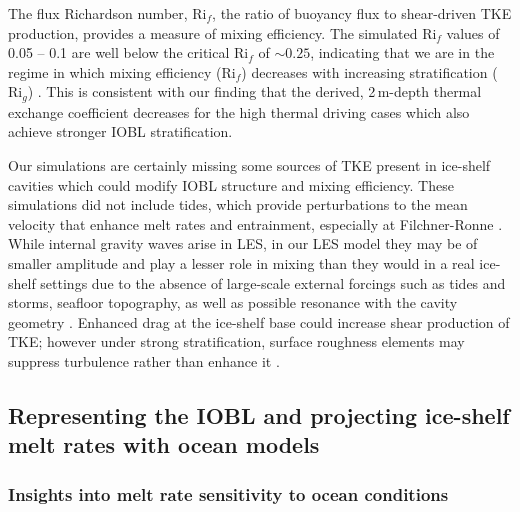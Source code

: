 \documentclass[tc, manuscript]{copernicus}
\begin{document}
The flux Richardson number, $\text{Ri}_f$, the ratio of buoyancy flux to shear-driven TKE production, provides a measure of mixing efficiency. The simulated $\text{Ri}_f$ values of 0.05 -- 0.1 are well below the critical $\text{Ri}_f$ of $\sim\!0.25$, indicating that we are in the regime in which mixing efficiency ($\text{Ri}_f$) decreases with increasing stratification ($\text{Ri}_g$) \citep{miles_stability_1961, howard_note_1961, armenio_investigation_2002, peltier_mixing_2003}. This is consistent with our finding that the derived, 2\,\unit{m}-depth thermal exchange coefficient decreases for the high thermal driving cases which also achieve stronger IOBL stratification.

Our simulations are certainly missing some sources of TKE present in ice-shelf cavities which could modify IOBL structure and mixing efficiency. These simulations did not include tides, which provide perturbations to the mean velocity that enhance melt rates and entrainment, especially at Filchner-Ronne \citep{makinson_modeling_1999, makinson_influence_2011, mueller_tidal_2018}. While internal gravity waves arise in LES, in our LES model they may be of smaller amplitude and play a lesser role in mixing than they would in a real ice-shelf settings due to the absence of large-scale external forcings such as tides and storms, seafloor topography, as well as possible resonance with the cavity geometry \citep{gwyther_cold_2020, mueller_impact_2012, padman_ocean_2018, robertson_tidally_2013}. Enhanced drag at the ice-shelf base could increase shear production of TKE; however under strong stratification, surface roughness elements may suppress turbulence rather than enhance it \citep{ohya_wind-tunnel_2001}. 

\subsection{Representing the IOBL and projecting ice-shelf melt rates with ocean models}\label{disc:prm}

\subsubsection{Insights into melt rate sensitivity to ocean conditions}\label{disc:prm_sens}
\end{document}

